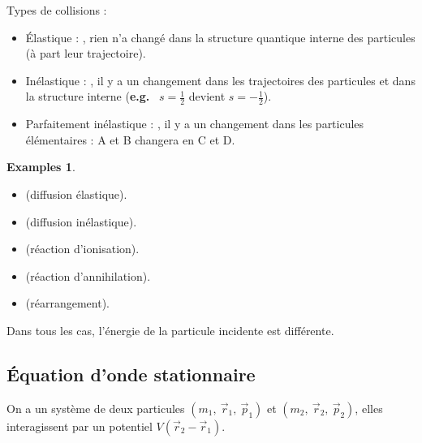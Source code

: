 \documentclass[12pt,a4paper,oneside,french]{book}
\theoremstyle{definition}
\theoremstyle{definition}
\theoremstyle{definition}
\newtheorem*{examples}{Examples}
\theoremstyle{remark}
\theoremstyle{definition}
\begin{document}
    \bigskip
    
    Types de collisions :
    
    \begin{itemize}
        \itemsep1.0em
        
        \item 
        Élastique : , rien n'a changé dans la structure quantique interne des particules (à part leur trajectoire).
        
        \item
        Inélastique : , il y a un changement dans les trajectoires des particules et dans la structure interne (\textbf{e.g.} \ $s = \frac{1}{2}$ devient $s = -\frac{1}{2}$).
        
        \item
        Parfaitement inélastique : , il y a un changement dans les particules élémentaires : A et B changera en C et D.
    \end{itemize}
    
    \begin{examples}
        \leavevmode
        
        \begin{itemize}
            \item
             (diffusion élastique).
            
            \item
             (diffusion inélastique).
            
            \item
             (réaction d'ionisation).
            
            \item
             (réaction d'annihilation).
            
            \item
             (réarrangement).
        \end{itemize}
    \end{examples}
    
    Dans tous les cas, l'énergie de la particule incidente est différente.
    
    \subsection{Équation d'onde stationnaire}
    On a un système de deux particules $({m}_{1}, \ {\vec{r}}_{1}, \ {\vec{p}}_{1})$ et $({m}_{2}, \ {\vec{r}}_{2}, \ {\vec{p}}_{2})$, elles interagissent par un potentiel $V({\vec{r}}_{2} - {\vec{r}}_{1})$. \\
    
\end{document}

